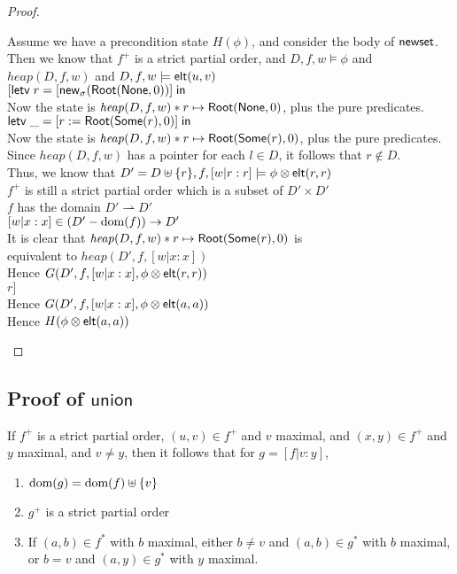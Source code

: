\begin{proof}
\begin{tabbedproof}
\oo Assume we have a precondition state $H(\phi)$, and consider the body of $\mathsf{newset}$. \\
\ooo Then we know that $f^+$ is a strict partial order, and $D,f,w \models \phi$ and \\
\oox $\mathit{heap}(D,f,w)$ and $D,f,w \models \mathsf{elt}({u}, {v})$ \\
\ooo $[\mathsf{letv}\;r = [\mathsf{new}_{\sigma}(\mathsf{Root}(\mathsf{None}, 0))]\;\mathsf{in}\;$ \\
\ooo Now the state is $\mathit{heap}(D,f,w) * r \mapsto \mathsf{Root}(\mathsf{None}, 0)$, plus the pure predicates. \\
\ooo $\mathsf{letv}\;\_ = [r := \mathsf{Root}(\mathsf{Some}(r), 0)]\;\mathsf{in}\;$ \\
\ooo Now the state is $\mathit{heap}(D,f,w) * r \mapsto \mathsf{Root}(\mathsf{Some}(r), 0)$, plus the pure predicates. \\
\ooo Since $\mathit{heap}(D,f,w)$ has a pointer for each $l \in D$, it follows that $r \not \in D$. \\
\ooo Thus, we know that $D' = D \uplus \{{r}\}, f, [w|r:r] \models \phi \otimes \mathsf{elt}({r}, {r})$ \\ 
\ooo $f^+$ is still a strict partial order which is a subset of $D' \times D'$ \\
\ooo $f$ has the domain $D' \rightharpoonup D'$ \\
\ooo $[w|x:x] \in (D' - \mbox{dom}({f})) \to D'$ \\
\ooo It is clear that $\mathit{heap}(D,f,w) * r \mapsto \mathsf{Root}(\mathsf{Some}(r), 0)$ is \\
\oox equivalent to $\mathit{heap}(D', f, [w|x:x])$ \\
\ooo Hence $G(D', f, [w|x:x], \phi \otimes \mathsf{elt}({r}, {r}))$ \\
\ooo $r]$ \\
\ooo Hence $G(D', f, [w|x:x], \phi \otimes \mathsf{elt}({a}, {a}))$ \\
\ooo Hence $H(\phi \otimes \mathsf{elt}({a}, {a}))$ 
\end{tabbedproof}
\end{proof}

\subsection{Proof of $\mathsf{union}$}

\begin{lemma}
If $f^+$ is a strict partial order, $(u, v) \in f^+$ and $v$ maximal,
and $(x, y) \in f^+$ and $y$ maximal, and $v \not= y$, then it follows that for $g = [f|v:y]$,

\begin{enumerate}
\item $\mbox{dom}({g}) = \mbox{dom}({f}) \uplus \{{v}\}$
\item $g^+$ is a strict partial order 
\item If $(a,b) \in f^*$ with $b$ maximal, either $b \not= v$ and $(a,b) \in g^*$ with $b$ maximal,
  or $b = v$ and $(a,y) \in g^*$ with $y$ maximal. 
\end{enumerate}
\end{lemma}

